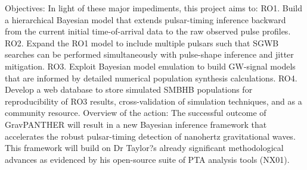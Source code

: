 \documentclass[11pt,letterpaper,sans]{moderncv} %
\begin{document}
Objectives: In light of these major impediments, this project aims to:
RO1.	Build a hierarchical Bayesian model that extends pulsar-timing inference backward from the current initial time-of-arrival data to the raw observed pulse profiles. 
RO2.	Expand the RO1 model to include multiple pulsars such that SGWB searches can be performed simultaneously with pulse-shape inference and jitter mitigation. 
RO3.	Exploit Bayesian model emulation to build GW-signal models that are informed by detailed numerical population synthesis calculations. 
RO4.	Develop a web database to store simulated SMBHB populations for reproducibility of RO3 results, cross-validation of simulation techniques, and as a community resource. 
Overview of the action: The successful outcome of GravPANTHER will result in a new Bayesian inference framework that accelerates the robust pulsar-timing detection of nanohertz gravitational waves. This framework will build on Dr Taylor?s already significant methodological advances as evidenced by his open-source suite of PTA analysis tools (NX01).
\end{document}
